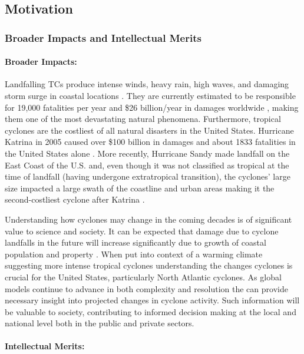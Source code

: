 \documentclass[11pt]{article}
\begin{document}
\subsection{Motivation} \label{sec:Motivation}

\subsubsection{Broader Impacts and Intellectual Merits}

\paragraph{Broader Impacts:}  

Landfalling TCs produce intense winds, heavy rain, high waves, and damaging storm surge in coastal locations \citep{EmanuelDivineWind}. They are currently estimated to be responsible for 19,000 fatalities per year and \$26 billion/year in damages worldwide \citep{Mendelsohn2012}, making them one of the most devastating natural phenomena. Furthermore, tropical cyclones are the costliest of all natural disasters in the United States\citep{Pielke1998}. Hurricane Katrina in 2005 caused over \$100 billion in damages and about 1833 fatalities in the United States alone \citep{Blake2011}. More recently, Hurricane Sandy made landfall on the East Coast of the U.S. and, even though it was not classified as tropical at the time of landfall (having undergone extratropical transition), the cyclones' large size impacted a large swath of the coastline and urban areas making it the second-costliest cyclone after Katrina \citep{Blake2013}.  

Understanding how cyclones may change in the coming decades is of significant value to science and society. It can be expected that damage due to cyclone landfalls in the future will increase significantly due to growth of coastal population and property \citep{Pielke2008}. When put into context of a warming climate suggesting more intense tropical cyclones \citep{Knutson2010} understanding the changes cyclones is crucial for the United States, particularly North Atlantic cyclones. As global models continue to advance in both complexity and resolution the can provide necessary insight into projected changes in cyclone activity.  Such information will be valuable to society, contributing to informed decision making at the local and national level both in the public and private sectors.

\paragraph{Intellectual Merits:}  
\end{document}
